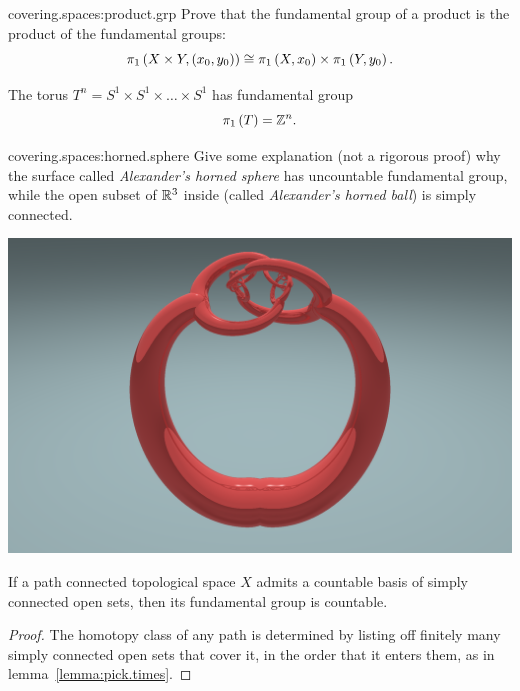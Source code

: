 \begin{problem}{covering.spaces:product.grp}
Prove that the fundamental group of a product is the product of the fundamental groups:
\[
\pi_{1}\left(X \times Y, \left(x_0,y_0\right)\right)
\cong
\pi_{1}\left(X, x_0\right)
\times
\pi_{1}\left(Y, y_0\right).
\]
\end{problem}
\begin{example}
The torus \(T^n=S^1 \times S^1 \times \dots \times S^1\) has fundamental group
\[
\pi_{1}\left(T\right)=\mathbb{Z}^{n}.
\]
\end{example}
\begin{problem}{covering.spaces:horned.sphere}
Give some explanation (not a rigorous proof) why the surface called \emph{Alexander's horned sphere} has uncountable fundamental group, while the open subset of \(\mathbb{R}^{3}\) inside (called \emph{Alexander's horned ball}) is simply connected.
\begin{center}
\includegraphics[width=\textwidth]{horned-sphere}
\cprotect{}
\end{center}
\end{problem}
\begin{corollary}\label{corollary:manifolds.countable.pi.1}
If a path connected topological space \(X\) admits a countable basis of simply connected open sets, then its fundamental group is countable.
\end{corollary}
\begin{proof}
The homotopy class of any path is determined by listing off finitely many simply connected open sets that cover it, in the order that it enters them, as in lemma~\vref{lemma:pick.times}.
\end{proof}
